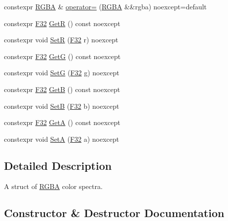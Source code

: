 \begin{DoxyCompactItemize}
\item 
constexpr \mbox{\hyperlink{structmage_1_1_r_g_b_a}{R\+G\+BA}} \& \mbox{\hyperlink{structmage_1_1_r_g_b_a_a66f6476166086849d031b99b458e6f7c}{operator=}} (\mbox{\hyperlink{structmage_1_1_r_g_b_a}{R\+G\+BA}} \&\&rgba) noexcept=default
\item 
constexpr \mbox{\hyperlink{namespacemage_aa97e833b45f06d60a0a9c4fc22ae02c0}{F32}} \mbox{\hyperlink{structmage_1_1_r_g_b_a_a2f312fc862e792247bb6ba0e5a5390ca}{GetR}} () const noexcept
\item 
constexpr void \mbox{\hyperlink{structmage_1_1_r_g_b_a_a1de1796391b58e1e1db1e2701f8a391c}{SetR}} (\mbox{\hyperlink{namespacemage_aa97e833b45f06d60a0a9c4fc22ae02c0}{F32}} r) noexcept
\item 
constexpr \mbox{\hyperlink{namespacemage_aa97e833b45f06d60a0a9c4fc22ae02c0}{F32}} \mbox{\hyperlink{structmage_1_1_r_g_b_a_a39db7aa6065db1aef0c774316865e0ae}{GetG}} () const noexcept
\item 
constexpr void \mbox{\hyperlink{structmage_1_1_r_g_b_a_a18cdea53caccd27337bd0a1c31208b64}{SetG}} (\mbox{\hyperlink{namespacemage_aa97e833b45f06d60a0a9c4fc22ae02c0}{F32}} g) noexcept
\item 
constexpr \mbox{\hyperlink{namespacemage_aa97e833b45f06d60a0a9c4fc22ae02c0}{F32}} \mbox{\hyperlink{structmage_1_1_r_g_b_a_ae4fd67f400f6c86c5c7614ba3b06feeb}{GetB}} () const noexcept
\item 
constexpr void \mbox{\hyperlink{structmage_1_1_r_g_b_a_a3c7dccbc089f0a190f470c9dc74e7c51}{SetB}} (\mbox{\hyperlink{namespacemage_aa97e833b45f06d60a0a9c4fc22ae02c0}{F32}} b) noexcept
\item 
constexpr \mbox{\hyperlink{namespacemage_aa97e833b45f06d60a0a9c4fc22ae02c0}{F32}} \mbox{\hyperlink{structmage_1_1_r_g_b_a_a31196d863851f8e2b178458a78702b42}{GetA}} () const noexcept
\item 
constexpr void \mbox{\hyperlink{structmage_1_1_r_g_b_a_a3b2ebef3e0f2d26707b0fb84de8aec12}{SetA}} (\mbox{\hyperlink{namespacemage_aa97e833b45f06d60a0a9c4fc22ae02c0}{F32}} a) noexcept
\end{DoxyCompactItemize}


\subsection{Detailed Description}
A struct of \mbox{\hyperlink{structmage_1_1_r_g_b_a}{R\+G\+BA}} color spectra. 

\subsection{Constructor \& Destructor Documentation}
\mbox{\label{structmage_1_1_r_g_b_a_afe334e4408a71e808b8cf0bc9dd06dde}} 
